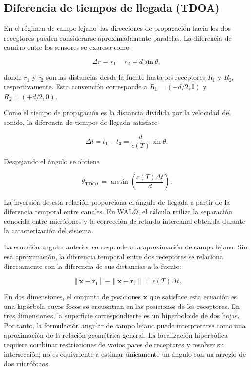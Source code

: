 \subsection{Diferencia de tiempos de llegada (TDOA)}

En el régimen de campo lejano, las direcciones de propagación hacia
los dos receptores pueden considerarse aproximadamente paralelas.
La diferencia de camino entre los sensores se expresa como

\begin{equation}
    \Delta r = r_1-r_2 = d\sin\theta,
    \label{eq:diferencia_camino_tdoa}
\end{equation}

donde $r_1$ y $r_2$ son las distancias desde la fuente hasta los
receptores $R_1$ y $R_2$, respectivamente. Esta convención corresponde
a $R_1=(-d/2,0)$ y $R_2=(+d/2,0)$.

Como el tiempo de propagación es la distancia dividida por la velocidad
del sonido, la diferencia de tiempos de llegada satisface

\begin{equation}
    \Delta t = t_1-t_2 =
    \frac{d}{c(T)}\sin\theta.
    \label{eq:diferencia_tiempos_tdoa}
\end{equation}

Despejando el ángulo se obtiene

\begin{equation}
    \theta_{\mathrm{TDOA}} =
    \arcsin\left(\frac{c(T)\Delta t}{d}\right).
    \label{eq:inversion_angular_tdoa}
\end{equation}

La inversión de esta relación proporciona el ángulo de llegada a
partir de la diferencia temporal entre canales. En WALO, el cálculo
utiliza la separación conocida entre micrófonos y la corrección de
retardo intercanal obtenida durante la caracterización del sistema.

La ecuación angular anterior corresponde a la aproximación de campo
lejano. Sin esa aproximación, la diferencia temporal entre dos
receptores se relaciona directamente con la diferencia de sus
distancias a la fuente:

\begin{equation}
    \|\mathbf{x}-\mathbf{r}_1\|
    -\|\mathbf{x}-\mathbf{r}_2\|
    = c(T)\Delta t.
    \label{eq:hiperbola_tdoa}
\end{equation}

En dos dimensiones, el conjunto de posiciones $\mathbf{x}$ que
satisface esta ecuación es una hipérbola cuyos focos se encuentran en
las posiciones de los receptores. En tres dimensiones, la superficie
correspondiente es un hiperboloide de dos hojas. Por tanto, la
formulación angular de campo lejano puede interpretarse como una
aproximación de la relación geométrica general. La localización
hiperbólica requiere combinar restricciones de varios pares de
receptores y resolver su intersección; no es equivalente a estimar
únicamente un ángulo con un arreglo de dos micrófonos.

